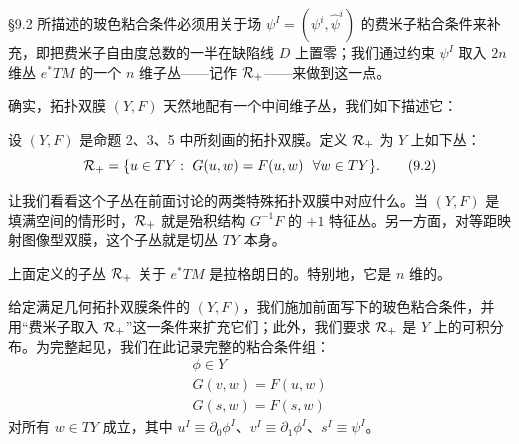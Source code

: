 §9.2 所描述的玻色粘合条件必须用关于场 $\psi^I=(\psi^i,\hat\psi^i)$ 的费米子粘合条件来补充，即把费米子自由度总数的一半在缺陷线 $D$ 上置零；我们通过约束 $\psi^I$ 取入 $2n$ 维丛 $e^*TM$ 的一个 $n$ 维子丛——记作 $\mathcal{R}_+$——来做到这一点。

确实，拓扑双膜 $(Y,F)$ 天然地配有一个中间维子丛，我们如下描述它：

\begin{definition}[7]
设 $(Y,F)$ 是命题 2、3、5 中所刻画的拓扑双膜。定义 $\mathcal{R}_+$ 为 $Y$ 上如下丛：
\begin{equation}
\cR_+=\{u\in TY:\ G(u,w)=F(u,w)\ \ \forall w\in TY\}. \tag{9.2}
\end{equation}
\end{definition}

让我们看看这个子丛在前面讨论的两类特殊拓扑双膜中对应什么。当 $(Y,F)$ 是填满空间的情形时，$\mathcal{R}_+$ 就是殆积结构 $G^{-1}F$ 的 $+1$ 特征丛。另一方面，对等距映射图像型双膜，这个子丛就是切丛 $TY$ 本身。

\begin{proposition}[6]
上面定义的子丛 $\mathcal{R}_+$ 关于 $e^*TM$ 是拉格朗日的。特别地，它是 $n$ 维的。
\end{proposition}

给定满足几何拓扑双膜条件的 $(Y,F)$，我们施加前面写下的玻色粘合条件，并用“费米子取入 $\mathcal{R}_+$”这一条件来扩充它们；此外，我们要求 $\mathcal{R}_+$ 是 $Y$ 上的可积分布。为完整起见，我们在此记录完整的粘合条件组：
\begin{gather*}
\phi\in Y \\
G(v,w)=F(u,w) \\
G(s,w)=F(s,w) 
\end{gather*}
对所有 $w\in TY$ 成立，其中 $u^I\equiv\partial_0\phi^I$、$v^I\equiv\partial_1\phi^I$、$s^I\equiv\psi^I$。

